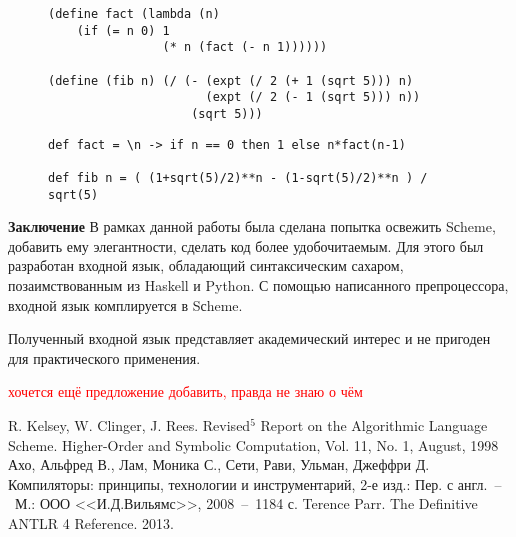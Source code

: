 \documentclass[12pt,a4paper,oneside]{extarticle}
\begin{document}
    \begin{figure}[h!]    
        \begin{lstlisting}[mathescape,label={lst:scheme},caption={Реализация функций fact и fib на Scheme},captionpos=b]
(define fact (lambda (n) 
    (if (= n 0) 1
                (* n (fact (- n 1))))))

(define (fib n) (/ (- (expt (/ 2 (+ 1 (sqrt 5))) n)
                      (expt (/ 2 (- 1 (sqrt 5))) n))
                    (sqrt 5)))
        \end{lstlisting}
    \end{figure}

    \begin{figure}[h!]  
        \begin{lstlisting}[mathescape,label={lst:lactose},caption={Реализация функций fact и fib на входном языке},captionpos=b]
def fact = \n -> if n == 0 then 1 else n*fact(n-1)

def fib n = ( (1+sqrt(5)/2)**n - (1-sqrt(5)/2)**n ) / sqrt(5)
        \end{lstlisting}
    \end{figure}


\noindent\textbf{Заключение} 
    В рамках данной работы была сделана попытка освежить Sсheme, добавить ему элегантности, сделать код более удобочитаемым.
    Для этого был разработан входной язык, обладающий синтаксическим сахаром, позаимствованным из Haskell и Python.
    С помощью написанного препроцессора, входной язык комплируется в Sсheme.

    Полученный входной язык представляет академический интерес и не пригоден для практического применения.

    \textcolor{red}{хочется ещё предложение добавить, правда не знаю о чём}


\begin{thebibliography}{00}
     R. Kelsey, W. Clinger, J. Rees. Revised$^5$ Report on the Algorithmic Language Scheme. Higher-Order and Symbolic Computation, Vol. 11, No. 1, August, 1998
     Ахо, Альфред В., Лам, Моника С., Сети, Рави, Ульман, Джеффри Д. Компиляторы: принципы, технологии и инструментарий, 2-е изд.: Пер. с англ.~--~М.: ООО <<И.Д.Вильямс>>, 2008~--~1184 с.
     Terence Parr. The Definitive ANTLR 4 Reference. 2013.
\end{thebibliography}
\end{document}
